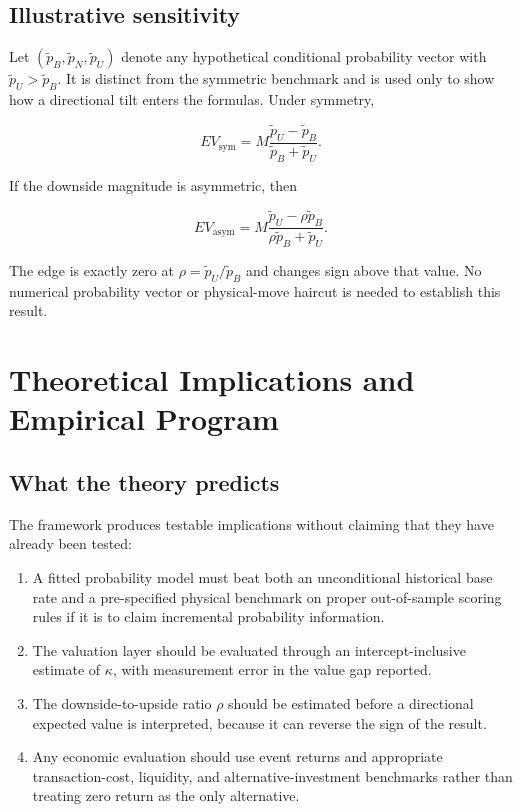 \subsection{Illustrative sensitivity}

Let $(\tilde p_B,\tilde p_N,\tilde p_U)$ denote any hypothetical conditional
probability vector with $\tilde p_U>\tilde p_B$. It is distinct from the
symmetric benchmark and is used only to show how a directional tilt enters the
formulas. Under symmetry,

\[
EV_{\mathrm{sym}}
=M\frac{\tilde p_U-\tilde p_B}{\tilde p_B+\tilde p_U}.
\]

If the downside magnitude is asymmetric, then

\[
EV_{\mathrm{asym}}
=M\frac{\tilde p_U-\rho\tilde p_B}
{\rho\tilde p_B+\tilde p_U}.
\]

The edge is exactly zero at $\rho=\tilde p_U/\tilde p_B$ and changes sign
above that value. No numerical probability vector or physical-move haircut is
needed to establish this result.

\section{Theoretical Implications and Empirical Program}
\label{sec:implications}

\subsection{What the theory predicts}

The framework produces testable implications without claiming that they have
already been tested:

\begin{enumerate}
\item A fitted probability model must beat both an unconditional historical
      base rate and a pre-specified physical benchmark on proper out-of-sample
      scoring rules if it is to claim incremental probability information.
\item The valuation layer should be evaluated through an intercept-inclusive
      estimate of $\kappa$, with measurement error in the value gap reported.
\item The downside-to-upside ratio $\rho$ should be estimated before a
      directional expected value is interpreted, because it can reverse the
      sign of the result.
\item Any economic evaluation should use event returns and appropriate
      transaction-cost, liquidity, and alternative-investment benchmarks rather
      than treating zero return as the only alternative.
\end{enumerate}

